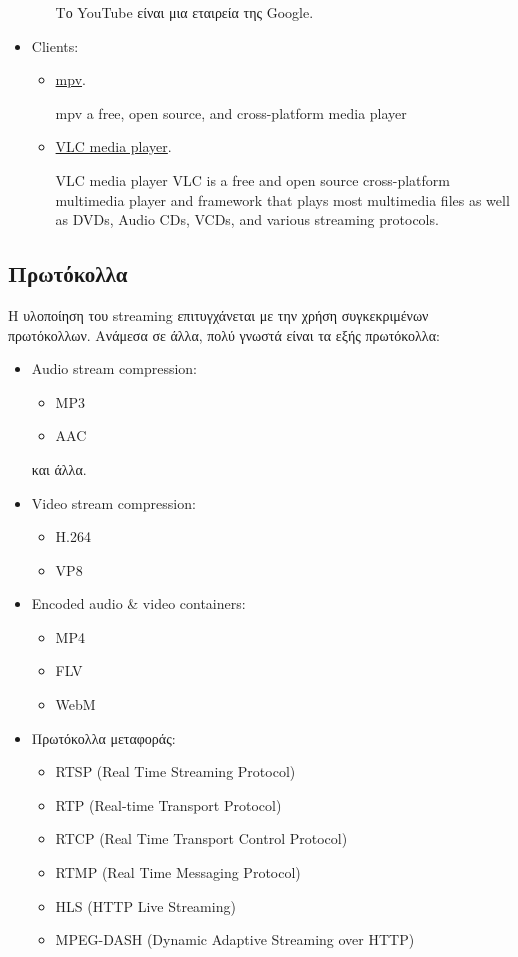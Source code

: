 \begin{itemize}
\begin{itemize}
\begin{displayquote}
Το YouTube είναι μια εταιρεία της Google.
        \end{displayquote}
    \end{itemize}

    \item Clients:
    \begin{itemize}
        \item \href{https://mpv.io/}{mpv}.
        \begin{displayquote}
mpv
a free, open source, and cross-platform media player
        \end{displayquote}
        \item \href{http://www.videolan.org/vlc/}{VLC media player}.
        \begin{displayquote}
VLC media player
VLC is a free and open source cross-platform multimedia player and framework that plays most multimedia files as well as DVDs, Audio CDs, VCDs, and various streaming protocols.
        \end{displayquote}
    \end{itemize}
\end{itemize}

\subsection{Πρωτόκολλα}
Η υλοποίηση του streaming επιτυγχάνεται με την χρήση συγκεκριμένων πρωτόκολλων.
Ανάμεσα σε άλλα, πολύ γνωστά είναι τα εξής πρωτόκολλα:
\begin{itemize}
\item Audio stream compression:
\begin{itemize}
\item MP3
\item AAC
\end{itemize}
και άλλα.

\item Video stream compression:
\begin{itemize}
\item H.264
\item VP8
\end{itemize}

\item Encoded audio \& video containers:
\begin{itemize}
\item MP4
\item FLV
\item WebM
\end{itemize}

\item Πρωτόκολλα μεταφοράς:
\begin{itemize}
\item RTSP (Real Time Streaming Protocol)
\item RTP (Real-time Transport Protocol)
\item RTCP (Real Time Transport Control Protocol)
\item RTMP (Real Time Messaging Protocol)
\item HLS (HTTP Live Streaming)
\item MPEG-DASH (Dynamic Adaptive Streaming over HTTP)
\end{itemize}
\end{itemize}
